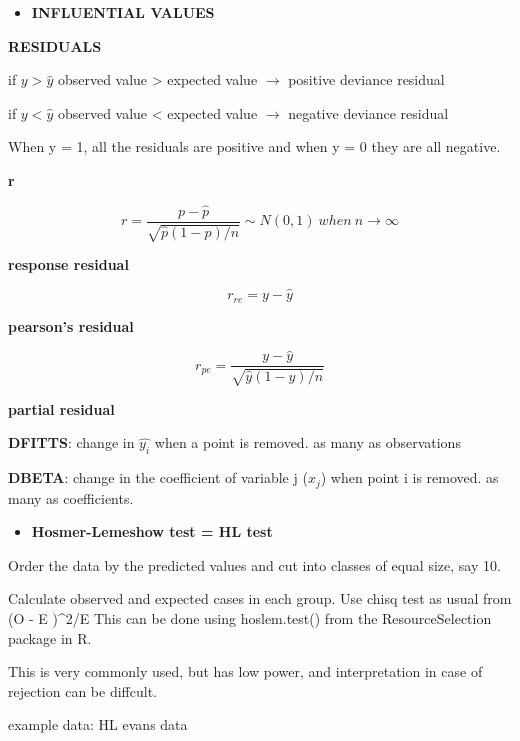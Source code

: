 \documentclass[
]{article}
\newenvironment{Shaded}{\begin{snugshade}}{\end{snugshade}}
\newcommand{\CommentTok}[1]{\textcolor[rgb]{0.56,0.35,0.01}{\textit{#1}}}
\newcommand{\DataTypeTok}[1]{\textcolor[rgb]{0.13,0.29,0.53}{#1}}
\newcommand{\KeywordTok}[1]{\textcolor[rgb]{0.13,0.29,0.53}{\textbf{#1}}}
\newcommand{\NormalTok}[1]{#1}
\newcommand{\OperatorTok}[1]{\textcolor[rgb]{0.81,0.36,0.00}{\textbf{#1}}}
\newcommand{\StringTok}[1]{\textcolor[rgb]{0.31,0.60,0.02}{#1}}
\providecommand{\tightlist}{%
  \setlength{\itemsep}{0pt}\setlength{\parskip}{0pt}}
\begin{document}
\begin{itemize}
\tightlist
\item
  \textbf{INFLUENTIAL VALUES}
\end{itemize}

\textbf{RESIDUALS}

if \(y > \hat{y}\) observed value \textgreater{} expected value \(\to\)
positive deviance residual

if \(y < \hat{y}\) observed value \textless{} expected value \(\to\)
negative deviance residual

When y = 1, all the residuals are positive and when y = 0 they are all
negative.

\textbf{r}

\[r=\frac{p-\hat{p}}{\sqrt{\hat{p}(1-p)/n}} \sim N(0,1) \: when\: n\to \infty\]

\textbf{response residual}

\[r_{re}= y- \hat{y}\]

\textbf{pearson's residual}

\[r_{pe}=\frac{y-\hat{y}}{\sqrt{\hat{y}(1-y)/n}}\]

\textbf{partial residual}

\textbf{DFITTS}: change in \(\hat{y_i}\) when a point is removed. as
many as observations

\textbf{DBETA}: change in the coefficient of variable j (\(x_j\)) when
point i is removed. as many as coefficients.

\begin{itemize}
\tightlist
\item
  \textbf{Hosmer-Lemeshow test = HL test}
\end{itemize}

Order the data by the predicted values and cut into classes of equal
size, say 10.

Calculate observed and expected cases in each group. Use chisq test as
usual from (O - E )\^{}2/E This can be done using hoslem.test() from the
ResourceSelection package in R.

This is very commonly used, but has low power, and interpretation in
case of rejection can be diffcult.

example data: HL evans data

\begin{Shaded}
\end{Shaded}
\end{document}
